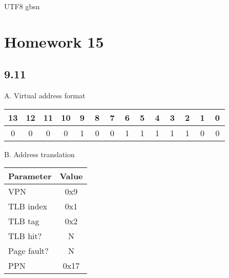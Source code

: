 \documentclass {article}
\begin{document}
\begin {CJK*} {UTF8} {gbsn}
		\section{Homework 15}
			\subsection{9.11}
				A. Virtual address format
				\begin{table}[!htbp]
					\begin{tabular}{cccccccccccccc}
						13                      & 12                     & 11                     & 10                     & 9                      & 8                      & 7                      & 6                      & 5                      & 4                      & 3                      & 2                      & 1                      & 0                      \\ \hline
						\multicolumn{1}{|c|}{\,0\,} & \multicolumn{1}{c|}{\,0\,} & \multicolumn{1}{c|}{\,0\,} & \multicolumn{1}{c|}{\,0\,} & \multicolumn{1}{c|}{\,1\,} & \multicolumn{1}{c|}{\,0\,} & \multicolumn{1}{c|}{\,0\,} & \multicolumn{1}{c|}{\,1\,} & \multicolumn{1}{c|}{\,1\,} & \multicolumn{1}{c|}{\,1\,} & \multicolumn{1}{c|}{\,1\,} & \multicolumn{1}{c|}{\,1\,} & \multicolumn{1}{c|}{\,0\,} & \multicolumn{1}{c|}{\,0\,} \\ \hline
					\end{tabular}
				\end{table}

				B. Address translation
				\begin{table}[!htbp]
					\begin{tabular}{lc}
						Parameter   & Value \\ \hline
						VPN         & 0x9   \\
						TLB index   & 0x1   \\
						TLB tag     & 0x2   \\
						TLB hit?    & N     \\
						Page fault? & N     \\
						PPN         & 0x17 
					\end{tabular}
				\end{table}


\end{CJK*}
\end{document}
